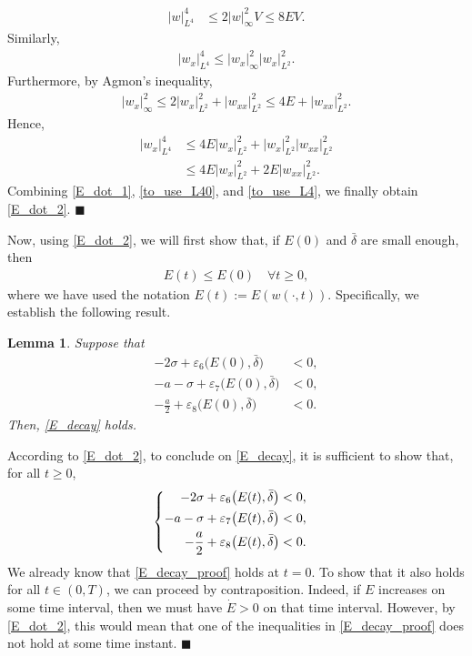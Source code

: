 \documentclass[twocolumn]{autart}
\newtheorem{lemm}{Lemma}
\newenvironment{lemma}{\begin{lemm}}{\hfill \end{lemm}}
\newenvironment{proof}{{\it Proof. }}{\hfill $\blacksquare$ }
\begin{document}
\begin{proof}
\begin{align}
|w|_{L^4}^4 &\leq 2|w|_{\infty}^2V \leq 8EV. \label{to_use_L40}
\end{align}
Similarly, 
\begin{align*}
|w_{x}|_{L^4}^4 \leq |w_x|_{\infty}^2|w_x|_{L^2}^2. 
\end{align*}
Furthermore, by Agmon's inequality,
\begin{align*}
|w_x|_{\infty}^2 \leq 2|w_x|_{L^2}^2+|w_{xx}|_{L^2}^2\leq 4E + |w_{xx}|_{L^2}^2. 
\end{align*}
Hence, 
\begin{align}
|w_x|_{L^4}^4 &\leq 4E |w_x|_{L^2}^2+|w_x|_{L^2}^2|w_{xx}|_{L^2}^2 \nonumber \\
&\leq 4E |w_x|_{L^2}^2 + 2E|w_{xx}|_{L^2}^2. \label{to_use_L4}
\end{align}
Combining \eqref{E_dot_1}, \eqref{to_use_L40}, and \eqref{to_use_L4}, we finally obtain \eqref{E_dot_2}.
\end{proof}

Now, using \eqref{E_dot_2}, we will first show that, if $E(0)$ and $\bar{\delta}$ are small enough, then
\begin{align}
E(t) \leq E(0) \quad \forall t\geq 0, \label{E_decay} 
\end{align}
where we have used the notation $E(t):=E(w(\cdot,t))$. Specifically, we establish the following result. 
\begin{lemma}
Suppose that
\begin{align}
-2\sigma + \varepsilon_6\big(E(0),\bar{\delta}\big) &< 0, \label{R1} \\
-a-\sigma +\varepsilon_7\big(E(0),\bar{\delta}\big) &<0, \label{R2} \\
-\frac{a}{2}+\varepsilon_8\big(E(0),\bar{\delta}\big) &< 0. \label{R3}
\end{align}
Then, \eqref{E_decay} holds.
\hfill  
\end{lemma}
\begin{proof}
According to \eqref{E_dot_2}, to conclude on \eqref{E_decay}, it is sufficient to show that, for all $t \geq 0$,
\begin{equation} \label{E_decay_proof}
\hspace{-0.3cm}\left\lbrace 
\begin{aligned}
-2\sigma + \varepsilon_6\big(E(t),\bar{\delta}\big) &< 0, \\
-a-\sigma +\varepsilon_7\big(E(t),\bar{\delta}\big) &<0, \\
-\frac{a}{2}+\varepsilon_8\big(E(t),\bar{\delta}\big) &< 0. 
\end{aligned}
\right. 
\end{equation}
We already know that \eqref{E_decay_proof} holds at $t=0$. To show that it also holds for all $t\in (0,T)$, we can proceed by contraposition. Indeed, if $E$ increases on some time interval, then we must have $\dot{E}>0$ on that time interval. However, by \eqref{E_dot_2}, this would mean that one of the inequalities in \eqref{E_decay_proof} does not hold at some time instant.
\end{proof}
\end{document}
